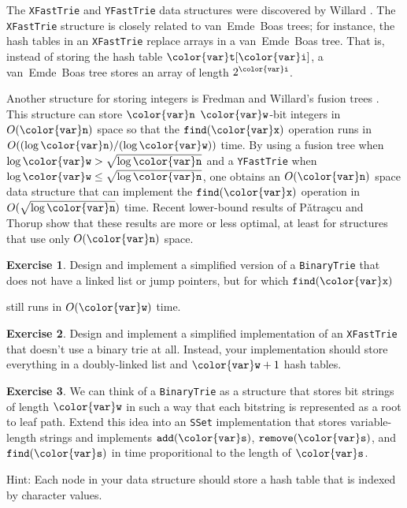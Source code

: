 \documentclass[10pt]{book}
\theoremstyle{plain}
\theoremstyle{definition}
\newtheorem{exc}{Exercise}[chapter]
\begin{document}
The \texttt{XFastTrie} and \texttt{YFastTrie} data structures were discovered by
Willard \cite{w83}.  The \texttt{XFastTrie} structure is closely related
to van~Emde~Boas trees;  for instance, the hash tables in an \texttt{XFastTrie}
replace arrays in a van~Emde~Boas tree.  That is, instead of storing
the hash table \ensuremath{\mathtt{{\color{var}t}[{\color{var}i}]}}, a van~Emde~Boas tree stores an array of length
$2^{\ensuremath{\mathtt{{\color{var}i}}}}$.

Another structure for storing integers is Fredman and Willard's fusion
trees \cite{fw93}.
%
This structure can store \ensuremath{\mathtt{{\color{var}n}}} \ensuremath{\mathtt{{\color{var}w}}}-bit integers in
$O(\ensuremath{\mathtt{{\color{var}n}}})$ space so that the \ensuremath{\mathtt{find({\color{var}x})}} operation runs in $O((\log \ensuremath{\mathtt{{\color{var}n}}})/(\log
\ensuremath{\mathtt{{\color{var}w}}}))$ time.  By using a fusion tree when $\log \ensuremath{\mathtt{{\color{var}w}}} > \sqrt{\log \ensuremath{\mathtt{{\color{var}n}}}}$ and
a \texttt{YFastTrie} when $\log \ensuremath{\mathtt{{\color{var}w}}} \le \sqrt{\log \ensuremath{\mathtt{{\color{var}n}}}}$, one obtains an $O(\ensuremath{\mathtt{{\color{var}n}}})$
space data structure that can implement the \ensuremath{\mathtt{find({\color{var}x})}} operation in
$O(\sqrt{\log \ensuremath{\mathtt{{\color{var}n}}}})$ time.  Recent lower-bound results of P\v{a}tra\c{s}cu
and Thorup \cite{pt07} show that these results are more or less optimal,
at least for structures that use only $O(\ensuremath{\mathtt{{\color{var}n}}})$ space.

\begin{exc}
  Design and implement a simplified version of a \texttt{BinaryTrie} that
  does not have a linked list or jump pointers, but for which \ensuremath{\mathtt{find({\color{var}x})}}

  still runs in $O(\ensuremath{\mathtt{{\color{var}w}}})$ time.
\end{exc}

\begin{exc}
  Design and implement a simplified implementation of an \texttt{XFastTrie}
  that doesn't use a binary trie at all. Instead, your implementation
  should store everything in a doubly-linked list and $\ensuremath{\mathtt{{\color{var}w}}}+1$
  hash tables.
\end{exc}

\begin{exc}
  We can think of a \texttt{BinaryTrie} as a structure that stores bit strings
  of length \ensuremath{\mathtt{{\color{var}w}}} in such a way that each bitstring is represented as a
  root to leaf path.  Extend this idea into an \texttt{SSet} implementation that
  stores variable-length strings and implements \ensuremath{\mathtt{add({\color{var}s})}}, \ensuremath{\mathtt{remove({\color{var}s})}},
  and \ensuremath{\mathtt{find({\color{var}s})}} in time proporitional to the length of \ensuremath{\mathtt{{\color{var}s}}}.

  \noindent Hint: Each node in your data structure should store a hash
  table that is indexed by character values.
\end{exc}
\end{document}
